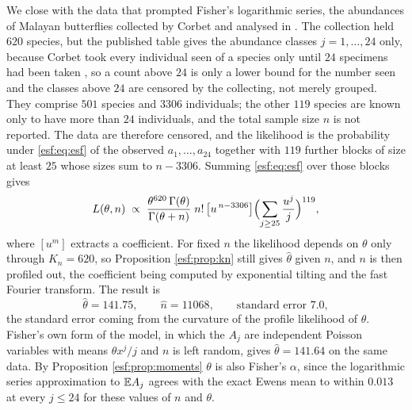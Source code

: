 We close with the data that prompted Fisher's logarithmic series, the abundances of
Malayan butterflies collected by Corbet and analysed in \citet{esf:fisher1943}. The collection held $620$ species, but the published table gives the abundance classes $j = 1, \dots, 24$ only, because Corbet took every individual seen of a species only until $24$ specimens had been taken \citep[p.~43]{esf:fisher1943}, so a count above $24$ is only a lower bound for the number seen and the classes above $24$ are censored by the collecting, not merely grouped. They comprise $501$ species and $3306$ individuals; the other $119$ species are known only to have more than $24$ individuals, and the total sample size $n$ is not reported. The data are therefore censored, and the likelihood is the probability under \eqref{esf:eq:esf} of the observed $a_1, \dots, a_{24}$ together with $119$ further blocks of size at least $25$ whose sizes sum to $n - 3306$. Summing \eqref{esf:eq:esf} over those blocks gives
\[
L(\theta, n) \;\propto\; \frac{\theta^{620}\, \Gamma(\theta)}{\Gamma(\theta+n)} \; n! \, \bigl[u^{\,n-3306}\bigr] \Bigl( \sum_{j \ge 25} \frac{u^{j}}{j} \Bigr)^{119} ,
\]
where $[u^m]$ extracts a coefficient. For fixed $n$ the likelihood depends on $\theta$ only through $K_n = 620$, so Proposition \ref{esf:prop:kn} still gives $\hat\theta$ given $n$, and $n$ is then profiled out, the coefficient being computed by exponential tilting and the fast Fourier transform. The result is
\[
\hat\theta = 141.75, \qquad \hat n = 11068, \qquad \text{standard error } 7.0,
\]
the standard error coming from the curvature of the profile likelihood of $\theta$. Fisher's own form of the model, in which the $A_j$ are independent Poisson variables with means $\theta x^{j}/j$ and $n$ is left random, gives $\hat\theta = 141.64$ on the same data. By Proposition \ref{esf:prop:moments} $\theta$ is also Fisher's $\alpha$, since the
logarithmic series approximation to $\mathbb{E} A_j$ agrees with the exact Ewens mean to within $0.013$
at every $j \le 24$ for these values of $n$ and $\theta$.

